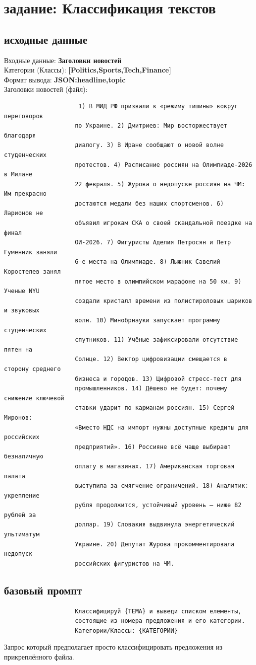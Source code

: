 \section{задание: Классификация текстов}
\subsection{исходные данные}
\indent Входные данные: \textbf{Заголовки новостей} \\
\indent Категории (Классы): \textbf{[Politics,Sports,Tech,Finance]} \\
\indent Формат вывода: \textbf{JSON:{headline,topic}} \\
\newpage
\noindent Заголовки новостей (файл):
\begin{verbatim}
					 1) В МИД РФ призвали к «режиму тишины» вокруг переговоров
					по Украине. 2) Дмитриев: Мир восторжествует благодаря
					диалогу. 3) В Иране сообщают о новой волне студенческих
					протестов. 4) Расписание россиян на Олимпиаде-2026 в Милане
					22 февраля. 5) Журова о недопуске россиян на ЧМ: Им прекрасно
					достаются медали без наших спортсменов. 6) Ларионов не
					объявил игрокам СКА о своей скандальной поездке на финал
					ОИ-2026. 7) Фигуристы Аделия Петросян и Петр Гуменник заняли
					6-е места на Олимпиаде. 8) Лыжник Савелий Коростелев занял
					пятое место в олимпийском марафоне на 50 км. 9) Ученые NYU
					создали кристалл времени из полистироловых шариков и звуковых
					волн. 10) Минобрнауки запускает программу студенческих
					спутников. 11) Учёные зафиксировали отсутствие пятен на
					Солнце. 12) Вектор цифровизации смещается в сторону среднего
					бизнеса и городов. 13) Цифровой стресс-тест для
					промышленников. 14) Дёшево не будет: почему снижение ключевой
					ставки ударит по карманам россиян. 15) Сергей Миронов:
					«Вместо НДС на импорт нужны доступные кредиты для российских
					предприятий». 16) Россияне всё чаще выбирают безналичную
					оплату в магазинах. 17) Американская торговая палата
					выступила за смягчение ограничений. 18) Аналитик: укрепление
					рубля продолжится, устойчивый уровень — ниже 82 рублей за
					доллар. 19) Словакия выдвинула энергетический ультиматум
					Украине. 20) Депутат Журова прокомментировала недопуск
					российских фигуристов на ЧМ.
\end{verbatim}
\newpage
\subsection{базовый промпт}
\begin{verbatim}
					Классифицируй {ТЕМА} и выведи списком елементы,
					состоящие из номера предложения и его категории.
					Категории/Классы: {КАТЕГОРИИ}
\end{verbatim}
Запрос который предполагает просто классифицировать предложения из прикреплённого файла.
